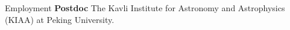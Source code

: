 \begin{rubric}{Employment}
%
	\textbf{Postdoc} The Kavli Institute for Astronomy and Astrophysics (KIAA) at Peking University. 
%
%
%
\end{rubric}